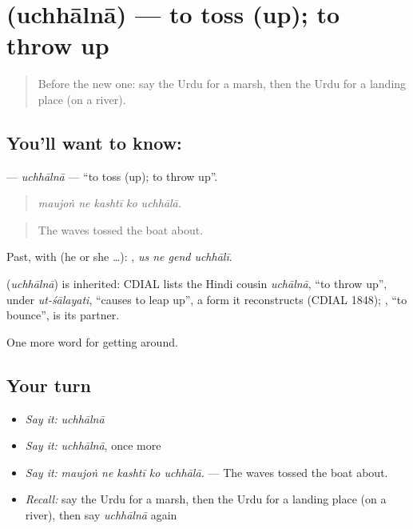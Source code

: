 \section[\texorpdfstring{\ur{اچھالنا} (uchhālnā)}{اچھالنا (uchhālnā)}]{ (uchhālnā) — to toss (up); to throw up}

\label{lesson:UR-C434-uchhaalna}



\begin{quote}
Before the new one: say the Urdu for a marsh, then the Urdu for a landing place (on a river).
\end{quote}

\subsection*{You'll want to know: }
\textbf{} — \emph{uchhālnā} — \textquotedblleft{}to toss (up); to throw up\textquotedblright{}.

\begin{quote}
    
\end{quote}

\begin{quote}
\emph{maujoṅ ne kashtī ko uchhālā.}
\end{quote}

\begin{quote}
The waves tossed the boat about.
\end{quote}

Past, with  (he or she …):    , \emph{us ne gend uchhālī}.

\begin{cousinweb}
\textbf{} (\emph{uchhālnā}) is inherited: CDIAL lists the Hindi cousin \emph{uchālnā}, \textquotedblleft{}to throw up\textquotedblright{}, under \emph{ut-śālayati}, \textquotedblleft{}causes to leap up\textquotedblright{}, a form it reconstructs (CDIAL 1848); \textbf{}, \textquotedblleft{}to bounce\textquotedblright{}, is its partner.
\end{cousinweb}

\begin{grammarlens}[title={What you've built}]
One more word for getting around.
\end{grammarlens}

\subsection*{Your turn}
\begin{itemize}
\raggedright
  \item \emph{Say it:} \emph{uchhālnā}
  \item \emph{Say it:} \emph{uchhālnā}, once more
  \item \emph{Say it:} \emph{maujoṅ ne kashtī ko uchhālā.} — The waves tossed the boat about.
  \item \emph{Recall:} say the Urdu for a marsh, then the Urdu for a landing place (on a river), then say \emph{uchhālnā} again
\end{itemize}

